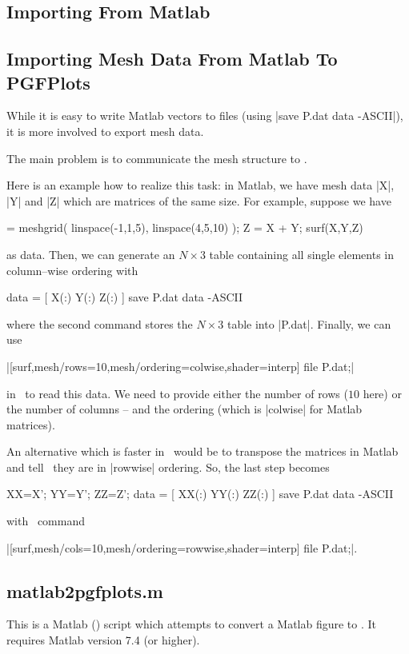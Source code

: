 {\begin{pgfgraphicnamed}
\section{Importing From Matlab}

\subsection{Importing Mesh Data From Matlab To PGFPlots}
While it is easy to write Matlab vectors to files (using |save P.dat data -ASCII|), it is more involved to export mesh data.

The main problem is to communicate the mesh structure to \PGFPlots.

Here is an example how to realize this task: in Matlab, we have mesh data |X|, |Y| and |Z| which are matrices of the same size. For example, suppose we have

\begin{codeexample} = meshgrid( linspace(-1,1,5), linspace(4,5,10) );
Z = X + Y;
surf(X,Y,Z)
\end{codeexample}
\noindent as data. Then, we can generate an $N \times 3$ table containing all single elements in column--wise ordering with

\begin{codeexample}
data = [ X(:) Y(:) Z(:) ]
save P.dat data -ASCII
\end{codeexample}
\noindent where the second command stores the $N \times 3$ table into |P.dat|. Finally, we can use 

|[surf,mesh/rows=10,mesh/ordering=colwise,shader=interp] file {P.dat};|

in \PGFPlots\ to read this data. We need to provide either the number of rows ($10$ here) or the number of columns -- and the ordering (which is |colwise| for Matlab matrices).

An alternative which is faster in \PGFPlots\ would be to transpose the matrices in Matlab and tell \PGFPlots\ they are in |rowwise| ordering. So, the last step becomes

\begin{codeexample}
XX=X'; YY=Y'; ZZ=Z';
data = [ XX(:) YY(:) ZZ(:) ]
save P.dat data -ASCII
\end{codeexample}
\noindent with \PGFPlots\ command

|[surf,mesh/cols=10,mesh/ordering=rowwise,shader=interp] file {P.dat};|.

\subsection{matlab2pgfplots.m}
This is a Matlab (\textregistered) script which attempts to convert a Matlab figure to \PGFPlots. It requires Matlab version 7.4 (or higher).


\end{pgfgraphicnamed}}
